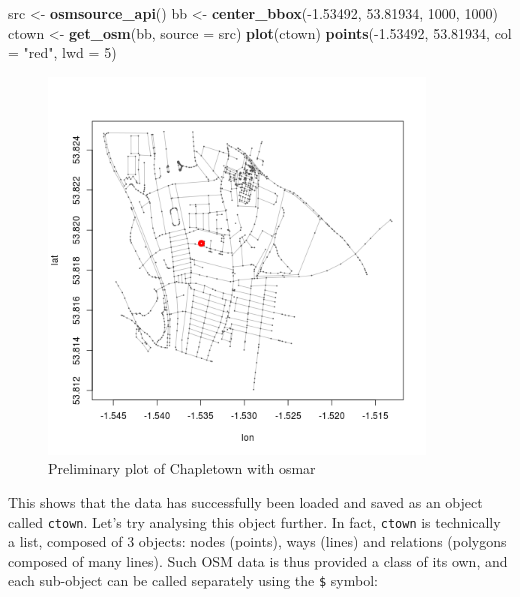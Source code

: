 \documentclass[]{article}
\newenvironment{Shaded}{}{}
\newcommand{\KeywordTok}[1]{\textcolor[rgb]{0.00,0.44,0.13}{\textbf{{#1}}}}
\newcommand{\DataTypeTok}[1]{\textcolor[rgb]{0.56,0.13,0.00}{{#1}}}
\newcommand{\DecValTok}[1]{\textcolor[rgb]{0.25,0.63,0.44}{{#1}}}
\newcommand{\FloatTok}[1]{\textcolor[rgb]{0.25,0.63,0.44}{{#1}}}
\newcommand{\StringTok}[1]{\textcolor[rgb]{0.25,0.44,0.63}{{#1}}}
\newcommand{\NormalTok}[1]{{#1}}
\let\Oldincludegraphics\includegraphics
\renewcommand{\includegraphics}[1]{\Oldincludegraphics[width=10cm]{#1}}
\begin{document}
\begin{Shaded}
\begin{Highlighting}[]
\NormalTok{src <- }\KeywordTok{osmsource_api}\NormalTok{()}
\NormalTok{bb <- }\KeywordTok{center_bbox}\NormalTok{(-}\FloatTok{1.53492}\NormalTok{, }\FloatTok{53.81934}\NormalTok{, }\DecValTok{1000}\NormalTok{, }\DecValTok{1000}\NormalTok{)}
\NormalTok{ctown <- }\KeywordTok{get_osm}\NormalTok{(bb, }\DataTypeTok{source =} \NormalTok{src)}
\KeywordTok{plot}\NormalTok{(ctown)}
\KeywordTok{points}\NormalTok{(-}\FloatTok{1.53492}\NormalTok{, }\FloatTok{53.81934}\NormalTok{, }\DataTypeTok{col =} \StringTok{"red"}\NormalTok{, }\DataTypeTok{lwd =} \DecValTok{5}\NormalTok{)}
\end{Highlighting}
\end{Shaded}
\begin{figure}[htbp]
\centering
\includegraphics{figure/Preliminary_plot_of_Chapletown_with_osmar.png}
\caption{Preliminary plot of Chapletown with osmar}
\end{figure}

This shows that the data has successfully been loaded and saved as an
object called \texttt{ctown}. Let's try analysing this object further.
In fact, \texttt{ctown} is technically a list, composed of 3 objects:
nodes (points), ways (lines) and relations (polygons composed of many
lines). Such OSM data is thus provided a class of its own, and each
sub-object can be called separately using the \texttt{\$} symbol:
\end{document}
